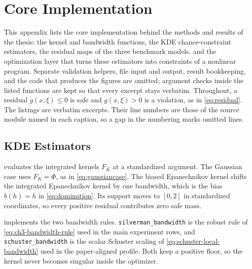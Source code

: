 \section{Core Implementation}
\label{app:code}

This appendix lists the core implementation behind the methods and results of
the thesis: the kernel and bandwidth functions, the KDE chance-constraint
estimators, the residual maps of the three benchmark models, and the
optimization layer that turns these estimators into constraints of a nonlinear
program. Separate validation helpers, file input and output, result bookkeeping, and the
code that produces the figures are omitted; argument checks inside the listed
functions are kept so that every excerpt stays verbatim. Throughout, a residual
$g(x,\xi)\leq0$ is safe and $g(x,\xi)>0$ is a violation, as in
\cref{eq:residual}.
The listings are verbatim excerpts. Their line numbers are those of the source
module named in each caption, so a gap in the numbering marks omitted lines.

\renewcommand{\thelstlisting}{\thesection.\arabic{lstlisting}}

\subsection{KDE Estimators}

 evaluates the integrated kernels $F_K$ at a standardized
argument. The Gaussian case uses $F_K=\Phi$, as in \cref{eq:gaussiancase}.
The biased Epanechnikov kernel shifts the integrated Epanechnikov kernel by one
bandwidth, which is the bias $b(h)=h$ in \cref{eq:domination}. Its support
moves to $[0,2]$ in standardized coordinates, so every positive residual
contributes zero safe mass.


 implements the two bandwidth rules.
\texttt{silverman\_bandwidth} is the robust rule of \cref{eq:ch3-bandwidth-rule}
used in the main experiment rows, and \texttt{schuster\_bandwidth} is the scalar
Schuster scaling of \cref{eq:schuster-local-bandwidth} used in the paper-aligned
profile. Both keep a positive floor, so the kernel never becomes singular inside
the optimizer.



